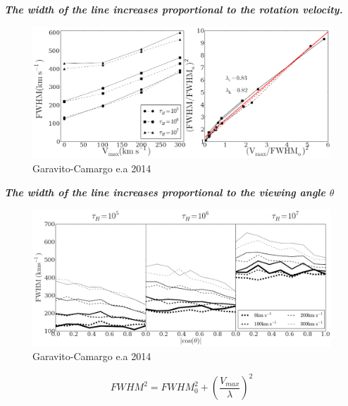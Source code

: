 \documentclass{beamer}
\begin{document}


\begin{frame}{\textit{\textbf{The width of the line increases proportional to the rotation velocity.}}}
\begin{figure}
\includegraphics[scale=0.26]{Figures/f7.png}
\caption*{Garavito-Camargo e.a 2014}
\end{figure}
\end{frame}


\begin{frame}{\textit{\textbf{The width of the line increases proportional to the viewing angle $\theta$}}}
\begin{figure}
\includegraphics[scale=0.23]{Figures/f6.png}
\caption*{Garavito-Camargo e.a 2014}
\end{figure}
\[
FWHM^2 = FWHM_0 ^2 + \left (\dfrac{V_{max}}{\lambda}\right ) ^2
\]
\end{frame}
\end{document}

